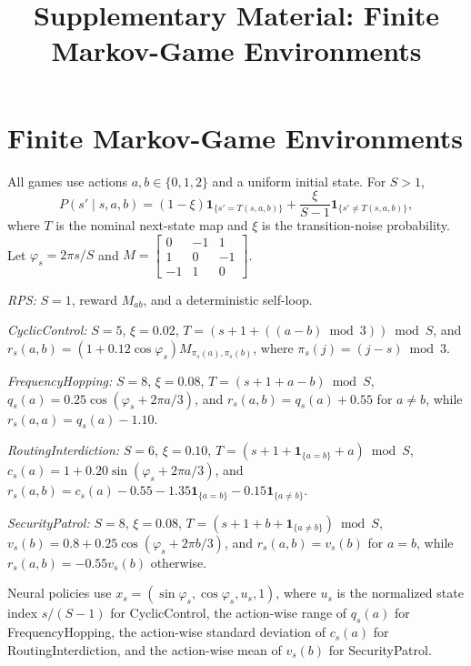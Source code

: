 \documentclass[journal]{IEEEtran}
\title{Supplementary Material: Finite Markov-Game Environments}
\author{}
\begin{document}
\maketitle
\section{Finite Markov-Game Environments}
All games use actions $a,b\in\{0,1,2\}$ and a uniform initial state. For $S>1$,
\[
P(s'\mid s,a,b)=(1-\xi)\mathbf 1_{\{s'=T(s,a,b)\}}
+\frac{\xi}{S-1}\mathbf 1_{\{s'\ne T(s,a,b)\}},
\]
where $T$ is the nominal next-state map and $\xi$ is the transition-noise probability. Let $\varphi_s=2\pi s/S$ and
$M=\left[\begin{smallmatrix}0&-1&1\\1&0&-1\\-1&1&0\end{smallmatrix}\right]$.

\emph{RPS:} $S=1$, reward $M_{ab}$, and a deterministic self-loop.

\emph{CyclicControl:} $S=5$, $\xi=0.02$,
$T=(s+1+((a-b)\bmod3))\bmod S$, and
$r_s(a,b)=(1+0.12\cos\varphi_s)M_{\pi_s(a),\pi_s(b)}$, where
$\pi_s(j)=(j-s)\bmod3$.

\emph{FrequencyHopping:} $S=8$, $\xi=0.08$,
$T=(s+1+a-b)\bmod S$,
$q_s(a)=0.25\cos(\varphi_s+2\pi a/3)$, and
$r_s(a,b)=q_s(a)+0.55$ for $a\ne b$, while $r_s(a,a)=q_s(a)-1.10$.

\emph{RoutingInterdiction:} $S=6$, $\xi=0.10$,
$T=(s+1+\mathbf1_{\{a=b\}}+a)\bmod S$,
$c_s(a)=1+0.20\sin(\varphi_s+2\pi a/3)$, and
$r_s(a,b)=c_s(a)-0.55-1.35\mathbf1_{\{a=b\}}-0.15\mathbf1_{\{a\ne b\}}$.

\emph{SecurityPatrol:} $S=8$, $\xi=0.08$,
$T=(s+1+b+\mathbf1_{\{a\ne b\}})\bmod S$,
$v_s(b)=0.8+0.25\cos(\varphi_s+2\pi b/3)$, and
$r_s(a,b)=v_s(b)$ for $a=b$, while $r_s(a,b)=-0.55v_s(b)$ otherwise.

Neural policies use $x_s=(\sin\varphi_s,\cos\varphi_s,u_s,1)$, where $u_s$ is the normalized state index $s/(S-1)$ for CyclicControl, the action-wise range of $q_s(a)$ for FrequencyHopping, the action-wise standard deviation of $c_s(a)$ for RoutingInterdiction, and the action-wise mean of $v_s(b)$ for SecurityPatrol.
\end{document}
